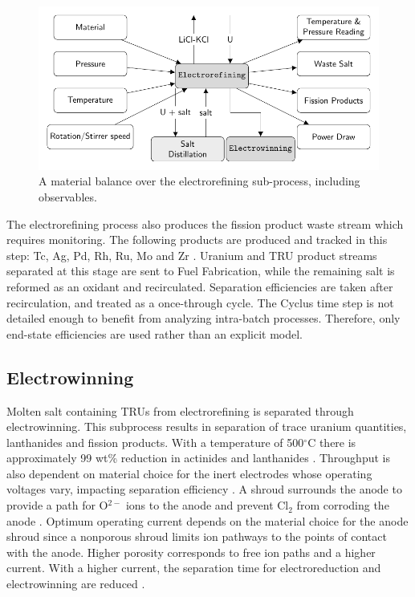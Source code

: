 \documentclass{anstrans}
\begin{document}
\begin{figure}[ht]
	\centering
	\includegraphics[width=1\linewidth]{refining}
	\caption{A material balance over the electrorefining sub-process, including observables.}
	\label{fig:refining}
\end{figure}

The electrorefining process also produces the fission product waste stream which requires monitoring. The following products are produced 
and tracked in this step: Tc, Ag, Pd, Rh, Ru, Mo and Zr \cite{flowsheet_1998}. Uranium and TRU product streams separated at this stage are sent to Fuel Fabrication, while the remaining salt is reformed as an oxidant and recirculated.
Separation efficiencies are taken after recirculation, and treated as a once-through cycle. The Cyclus time step
is not detailed enough to benefit from analyzing intra-batch processes. Therefore, only end-state efficiencies are used rather than an explicit model.

\subsection{Electrowinning}

Molten salt containing TRUs from electrorefining is separated through electrowinning. This subprocess results in separation of trace uranium quantities, lanthanides and fission products. 
With a temperature of 500$^{\circ}$C there is approximately 99 wt\% reduction in actinides and lanthanides \cite{flowsheet_1998}. 
Throughput is also dependent on material choice for the inert electrodes whose operating voltages vary, impacting separation 
efficiency \cite{koyama_development_2012}. A shroud surrounds the anode to provide a path for O$^{2-}$ ions to the anode and 
prevent Cl$_2$ from corroding the anode \cite{kim_development_2013,choi_electrochemical_2015}. Optimum operating current 
depends on the material choice for the anode shroud since a nonporous shroud limits ion pathways to the points of contact 
with the anode. Higher porosity corresponds to free ion paths and a higher current. With a higher current, the separation 
time for electroreduction and electrowinning are reduced \cite{choi_electrochemical_2015}.
\end{document}
